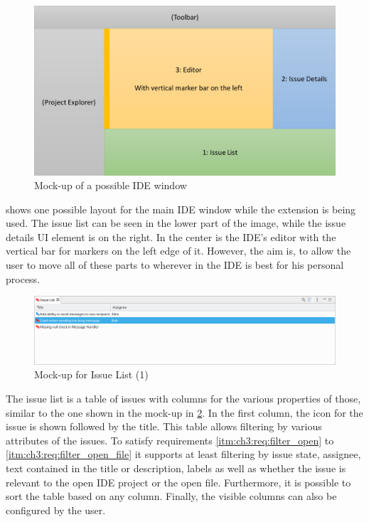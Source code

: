 \begin{figure}[!h]
	\centering
	\includegraphics[width=\textwidth]{graphics/mockOverview.pdf}
	\caption{Mock-up of a possible \gls{IDE} window}
	\label{fig:c3:mockup_overview}
\end{figure}
 shows one possible layout for the main \gls{IDE} window while the extension is being used.
The issue list can be seen in the lower part of the image, while the issue details \gls{UI} element is on the right.
In the center is the \gls{IDE}'s editor with the vertical bar for markers on the left edge of it.
However, the aim is, to allow the user to move all of these parts to wherever in the \gls{IDE} is best for his personal process.

\begin{figure}[!h]
	\centering
	\includegraphics[width=\textwidth]{graphics/concept_mockup_issueList.png}
	\caption{Mock-up for Issue List (1)}
	\label{fig:c3:mockup_issueList}
\end{figure}
The issue list is a table of issues with columns for the various properties of those, 
similar to the one shown in the mock-up in \cref{fig:c3:mockup_issueList}.
In the first column, the icon for the issue is shown followed by the title.
This table allows filtering by various attributes of the issues.
To satisfy requirements \ref{itm:ch3:req:filter_open} to \ref{itm:ch3:req:filter_open_file} it supports at least filtering
by issue state, assignee, text contained in the title or description, 
labels as well as whether the issue is relevant to the open \gls{IDE} project or the open file.
Furthermore, it is possible to sort the table based on any column. 
Finally, the visible columns can also be configured by the user.

